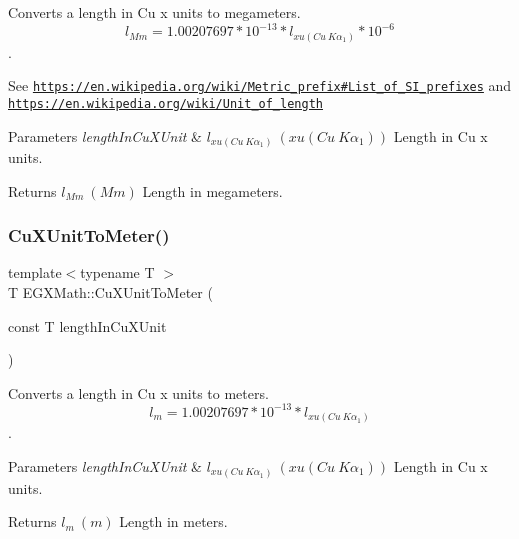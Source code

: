 Converts a length in Cu x units to megameters. \[ l_{Mm}=1.00207697*10^{-13} * l_{xu(Cu\ K\alpha_1)} * 10^{-6} \]. 

See \href{https://en.wikipedia.org/wiki/Metric_prefix#List_of_SI_prefixes}{\tt https\+://en.\+wikipedia.\+org/wiki/\+Metric\+\_\+prefix\#\+List\+\_\+of\+\_\+\+S\+I\+\_\+prefixes} and \href{https://en.wikipedia.org/wiki/Unit_of_length}{\tt https\+://en.\+wikipedia.\+org/wiki/\+Unit\+\_\+of\+\_\+length} 
\begin{DoxyParams}{Parameters}
{\em length\+In\+Cu\+X\+Unit} & $ l_{xu(Cu\ K\alpha_1)}\ (xu(Cu\ K\alpha_1))$ Length in Cu x units. \\
\hline
\end{DoxyParams}
\begin{DoxyReturn}{Returns}
$ l_{Mm}\ (Mm)$ Length in megameters. 
\end{DoxyReturn}
\mbox{\label{group___e_g_x_math-_conversions-_length_conversions-_non-_s_i-_cu_x_unit-_s_i_ga2879f79428ad854a11b3309d893ef9f7}} 
\subsubsection{\texorpdfstring{Cu\+X\+Unit\+To\+Meter()}{CuXUnitToMeter()}}
{\footnotesize\ttfamily template$<$typename T $>$ \\
T E\+G\+X\+Math\+::\+Cu\+X\+Unit\+To\+Meter (\begin{DoxyParamCaption}\item[{const T}]{length\+In\+Cu\+X\+Unit }\end{DoxyParamCaption})}



Converts a length in Cu x units to meters. \[ l_{m}=1.00207697*10^{-13} * l_{xu(Cu\ K\alpha_1)} \]. 


\begin{DoxyParams}{Parameters}
{\em length\+In\+Cu\+X\+Unit} & $ l_{xu(Cu\ K\alpha_1)}\ (xu(Cu\ K\alpha_1))$ Length in Cu x units. \\
\hline
\end{DoxyParams}
\begin{DoxyReturn}{Returns}
$ l_{m}\ (m)$ Length in meters. 
\end{DoxyReturn}
\mbox{\label{group___e_g_x_math-_conversions-_length_conversions-_non-_s_i-_cu_x_unit-_s_i_gaff5d323918d6135f9e7643a5c6a17414}} 
